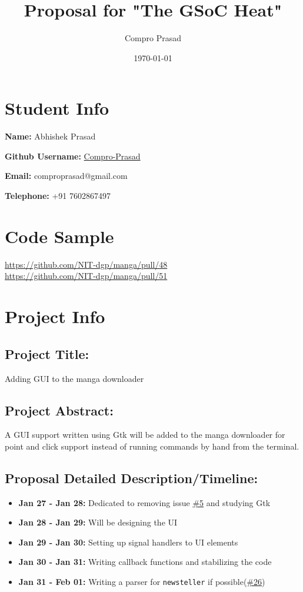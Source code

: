 \documentclass[11pt]{article}
\author{Compro Prasad}
\date{\today}
\title{Proposal for "The GSoC Heat"}
\begin{document}
\maketitle

\section{Student Info}
\label{sec:org4096517}
\textbf{Name:} Abhishek Prasad

\textbf{Github Username:} \href{https://github.com/Compro-Prasad}{Compro-Prasad}

\textbf{Email:} comproprasad@gmail.com

\textbf{Telephone:} +91 7602867497

\section{Code Sample}
\label{sec:org2f511e1}

\url{https://github.com/NIT-dgp/manga/pull/48}\\
\url{https://github.com/NIT-dgp/manga/pull/51}

\section{Project Info}
\label{sec:org6790d56}

\subsection{Project Title:}
\label{sec:org68ed58f}
Adding GUI to the manga downloader

\subsection{Project Abstract:}
\label{sec:org397a9e8}
A GUI support written using Gtk will be added to the manga downloader
for point and click support instead of running commands by hand from
the terminal.

\subsection{Proposal Detailed Description/Timeline:}
\label{sec:orge1e2486}
\begin{itemize}
\item \textbf{Jan 27 - Jan 28:} Dedicated to removing issue \href{https://github.com/NIT-dgp/manga/issues/5}{\#5} and studying Gtk
\item \textbf{Jan 28 - Jan 29:} Will be designing the UI
\item \textbf{Jan 29 - Jan 30:} Setting up signal handlers to UI elements
\item \textbf{Jan 30 - Jan 31:} Writing callback functions and stabilizing the code
\item \textbf{Jan 31 - Feb 01:} Writing a parser for \texttt{newsteller} if possible(\href{https://github.com/NIT-dgp/manga/issues/26}{\#26})
\end{itemize}
\end{document}
